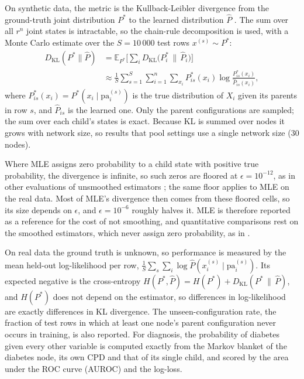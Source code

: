\documentclass[a4paper,fleqn]{cas-dc}
\newcommand{\KL}{D_{\mathrm{KL}}}
\begin{document}
On synthetic data, the metric is the Kullback-Leibler divergence from the ground-truth joint distribution $P^*$ to the learned distribution $\hat P$ \citep[App.~A.1.3]{koller2009probabilistic}. The sum over all $r^n$ joint states is intractable, so the chain-rule decomposition is used, with a Monte Carlo estimate over the $S=10\,000$ test rows $x^{(s)}\sim P^*$:
\begin{align*}
\KL(P^*\|\hat P) &= \mathbb{E}_{P^*}\Big[\sum_{i} \KL\big(P^*_{i}\,\|\,\hat P_{i}\big)\Big] \\
&\approx \frac{1}{S}\sum_{s=1}^{S}\sum_{i=1}^{n}\sum_{x_i} P^*_{is}(x_i)\log\frac{P^*_{is}(x_i)}{\hat P_{is}(x_i)},
\end{align*}
where $P^*_{is}(x_i) = P^*(x_i\mid \mathrm{pa}_i^{(s)})$ is the true distribution of $X_i$ given its parents in row $s$, and $\hat P_{is}$ is the learned one. Only the parent configurations are sampled; the sum over each child's states is exact. Because KL is summed over nodes it grows with network size, so results that pool settings use a single network size (30 nodes).

Where MLE assigns zero probability to a child state with positive true probability, the divergence is infinite, so such zeros are floored at $\epsilon=10^{-12}$, as in other evaluations of unsmoothed estimators \citep{nafar2025extracting}; the same floor applies to MLE on the real data. Most of MLE's divergence then comes from these floored cells, so its size depends on $\epsilon$, and $\epsilon=10^{-6}$ roughly halves it. MLE is therefore reported as a reference for the cost of not smoothing, and quantitative comparisons rest on the smoothed estimators, which never assign zero probability, as in \citet{niculescu2006bayesian}.

On real data the ground truth is unknown, so performance is measured by the mean held-out log-likelihood per row, $\frac{1}{S}\sum_s\sum_i \log\hat P(x_i^{(s)}\mid\mathrm{pa}_i^{(s)})$. Its expected negative is the cross-entropy $H(P^*,\hat P) = H(P^*) + \KL(P^*\,\|\,\hat P)$, and $H(P^*)$ does not depend on the estimator, so differences in log-likelihood are exactly differences in KL divergence. The unseen-configuration rate, the fraction of test rows in which at least one node's parent configuration never occurs in training, is also reported. For diagnosis, the probability of diabetes given every other variable is computed exactly from the Markov blanket of the diabetes node, its own CPD and that of its single child, and scored by the area under the ROC curve (AUROC) and the log-loss.
\end{document}

